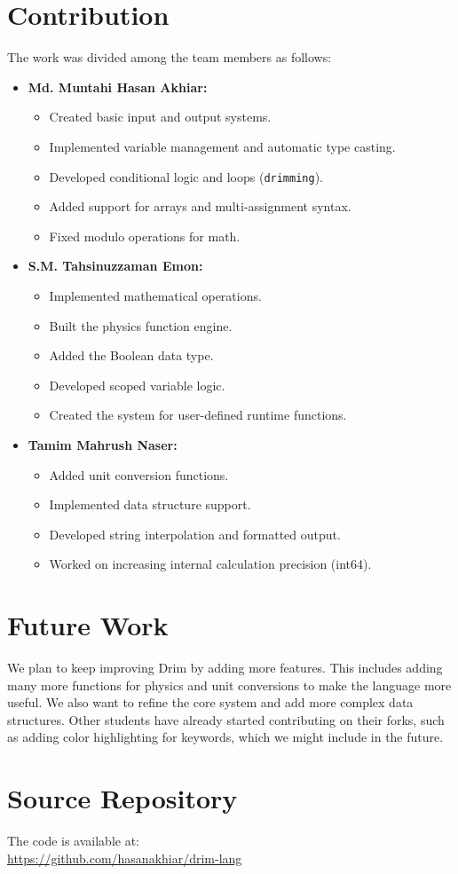 \documentclass[12pt, a4paper]{article}
\begin{document}
\newpage

\section{Contribution}
The work was divided among the team members as follows:
\begin{itemize}
    \item \textbf{Md. Muntahi Hasan Akhiar:}
    \begin{itemize}
        \item Created basic input and output systems.
        \item Implemented variable management and automatic type casting.
        \item Developed conditional logic and loops (\texttt{drimming}).
        \item Added support for arrays and multi-assignment syntax.
        \item Fixed modulo operations for math.
    \end{itemize}
    \item \textbf{S.M. Tahsinuzzaman Emon:}
    \begin{itemize}
        \item Implemented mathematical operations.
        \item Built the physics function engine.
        \item Added the Boolean data type.
        \item Developed scoped variable logic.
        \item Created the system for user-defined runtime functions.
    \end{itemize}
    \item \textbf{Tamim Mahrush Naser:}
    \begin{itemize}
        \item Added unit conversion functions.
        \item Implemented data structure support.
        \item Developed string interpolation and formatted output.
        \item Worked on increasing internal calculation precision (int64).
    \end{itemize}
\end{itemize}

\newpage

\section{Future Work}
We plan to keep improving Drim by adding more features. This includes adding many more functions for physics and unit conversions to make the language more useful. We also want to refine the core system and add more complex data structures. Other students have already started contributing on their forks, such as adding color highlighting for keywords, which we might include in the future.

\newpage

\section{Source Repository}
The code is available at: \\
\url{https://github.com/hasanakhiar/drim-lang}
\end{document}
